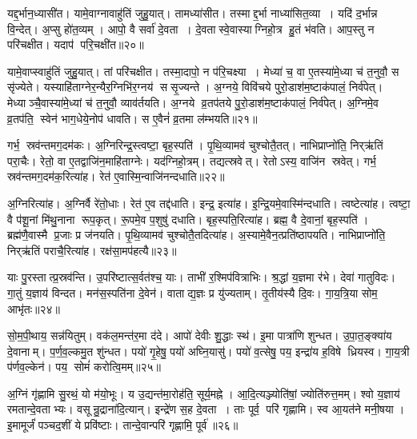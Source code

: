 यद्द॒र्भान॒ध्यासी॑त।
यामे॒वाग्नावाहु॑तिं जुहु॒यात्।
तामध्या॑सीत।
तस्माद्द॒र्भा नाध्या॑सित॒व्या।
यदि॑ द॒र्भान्न वि॒न्देत्।
अ॒प्सु हो॑त॒व्यम्।
आपो॒ वै सर्वा॑ दे॒वता।
दे॒वतास्वे॒वास्याग्निहो॒त्र हु॒तं भ॑वति।
आप॒स्तु न परि॑चक्षीत।
यदाप॑ परि॒चक्षी॑त॥२०॥

यामे॒वाप्स्वाहु॑तिं जुहु॒यात्।
तां परि॑चक्षीत।
तस्मा॒दापो॒ न प॑रि॒चक्ष्या।
मेध्या॑ च॒ वा ए॒तस्या॑मे॒ध्या च॑ त॒नुवौ॒ स सृ॑ज्येते।
यस्याहि॑ताग्नेर॒न्यैर॒ग्निभि॑र॒ग्नय॑ ससृ॒ज्यन्ते।
अ॒ग्नये॒ विवि॑चये पुरो॒डाश॑म॒ष्टाक॑पालं॒ निर्व॑पेत्।
मेध्याञ्चै॒वास्या॑मे॒ध्यां च॑ त॒नुवौ॒ व्याव॑र्तयति।
अ॒ग्नये व्र॒तप॑तये पु॒रो॒डाश॑म॒ष्टाक॑पालं॒ निर्व॑पेत्।
अ॒ग्निमे॒व व्र॒तप॑ति॒ स्वेन॑ भाग॒धेये॒नोप॑ धावति।
स ए॒वैनं॑ व्र॒तमा ल॑म्भयति॥२१॥

गर्भ॒ स्रव॑न्तमग॒दम॑कः।
अ॒ग्निरिन्द्र॒स्त्वष्टा॒ बृह॒स्पति॑।
पृ॒थि॒व्यामव॑ चुश्चोतै॒तत्।
नाभिप्राप्नो॑ति॒ निर्‌ऋ॑तिं परा॒चैः।
रेतो॒ वा ए॒तद्वाजि॑न॒माहि॑ताग्नेः।
यद॑ग्निहो॒त्रम्।
तद्यत्स्रवेत्।
रेतोऽस्य॒ वाजि॑न स्रवेत्।
गर्भ॒ स्रव॑न्तमग॒दम॑क॒रित्या॑ह।
रेत॑ ए॒वास्मि॒न्वाजि॑नन्दधाति॥२२॥

अ॒ग्निरित्या॑ह।
अ॒ग्निर्वै रे॑तो॒धाः।
रेत॑ ए॒व तद्द॑धाति।
इन्द्र॒ इत्या॑ह।
इ॒न्द्रि॒यमे॒वास्मि॑न्दधाति।
त्वष्टेत्या॑ह।
त्वष्टा॒ वै प॑शू॒नां मि॑थु॒नाना रूप॒कृत्।
रू॒पमे॒व प॒शुषु॑ दधाति।
बृह॒स्पति॒रित्या॑ह।
ब्रह्म॒ वै दे॒वानां॒ बृह॒स्पति॑।
ब्रह्म॑णै॒वास्मै प्र॒जाः प्र ज॑नयति।
पृ॒थि॒व्यामव॑ चुश्चोतै॒तदित्या॑ह।
अ॒स्यामे॒वैन॒त्प्रति॑ष्ठापयति।
नाभिप्राप्नो॑ति॒ निर्‌ऋ॑तिं पराचै॒रित्या॑ह।
रक्ष॑सा॒मप॑हत्यै॥२३॥

याः पु॒रस्तात्प्र॒स्रव॑न्ति।
उ॒परि॑ष्टात्स॒र्वत॑श्च॒ याः।
ताभी॑ र॒श्मिप॑वित्राभिः।
श्र॒द्धां य॒ज्ञमा र॑भे।
देवा॑ गातुविदः।
गा॒तुं य॒ज्ञाय॑ विन्दत।
मन॑स॒स्पति॑ना दे॒वेन॑।
वाताद्य॒ज्ञः प्र यु॑ज्यताम्।
तृ॒तीय॑स्यै दि॒वः।
गा॒य॒त्रि॒या सोम॒ आभृ॑तः॥२४॥

सो॒म॒पी॒थाय॒ सन्न॑यितुम्।
वक॑ल॒मन्त॑र॒मा द॑दे।
आपो॑ देवीः शु॒द्धाः स्थ॑।
इ॒मा पात्रा॑णि शुन्धत।
उ॒पा॒त॒ङ्क्या॑य दे॒वानाम्।
प॒र्ण॒व॒ल्कमु॒त शु॑न्धत।
पयो॑ गृ॒हेषु॒ पयो॑ अघ्नि॒यासु॑।
पयो॑ व॒त्सेषु॒ पय॒ इन्द्रा॑य ह॒विषे ध्रियस्व।
गा॒य॒त्री प॑र्णव॒ल्केन॑।
पय॒ सोमं॑ करोत्वि॒मम्॥२५॥

अ॒ग्निं गृ॑ह्णामि सु॒रथं॒ यो म॑यो॒भूः।
य उ॒द्यन्त॑मा॒रोह॑ति॒ सूर्य॒मह्ने।
आ॒दि॒त्यञ्ज्योति॑षां॒ ज्योति॑रुत्त॒मम्।
श्वो य॒ज्ञाय॑ रमतान्दे॒वताभ्यः।
वसून्रु॒द्राना॑दि॒त्यान्।
इन्द्रे॑ण स॒ह दे॒वता।
ताः पूर्व॒ परि॑ गृह्णामि।
स्व आ॒यत॑ने मनी॒षया।
इ॒मामूर्जं॑ पञ्चद॒शीं ये प्रवि॑ष्टाः।
तान्दे॒वान्परि॑ गृह्णामि॒ पूर्व॑॥२६॥

